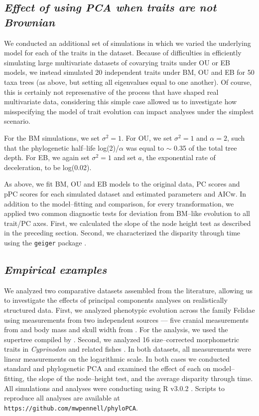 \documentclass[a4paper,11pt]{article}
\begin{document}
\subsection{\emph{Effect of using PCA when traits are not Brownian}}
We conducted an additional set of simulations in which we varied the underlying model for each of the traits in the dataset. Because of difficulties in efficiently simulating large multivariate datasets of covarying traits under OU or EB models, we instead simulated 20 independent traits under BM, OU and EB for 50 taxa trees (as above, but setting all eigenvalues equal to one another). Of course, this is certainly not represenative of the process that have shaped real multivariate data, considering this simple case allowed us to investigate how misspecifying the model of trait evolution can impact analyses under the simplest scenario.

For the BM simulations, we set $\sigma^2=\text{1}$. For OU, we set $\sigma^2=\text{1}$ and $\alpha=\text{2}$, such that the phylogenetic half--life log(2)/$\alpha$ \citep{Hansen2008} was equal to $\sim$ 0.35 of the total tree depth. For EB, we again set $\sigma^2=\text{1}$ and set $a$, the exponential rate of deceleration, to be log(0.02). 

As above, we fit BM, OU and EB models to the original data, PC scores and pPC scores for each simulated dataset and estimated parameters and AICw. In addition to the model--fitting and comparison, for every transformation, we applied two common diagnostic tests for deviation from BM--like evolution to all trait/PC axes. First, we calculated the slope of the node height test as described in the preceding section. Second, we characterized the disparity through time \citep{Harmon2003} using the \texttt{geiger} package \citep{geiger2}. 


\subsection{\emph{Empirical examples}}
We analyzed two comparative datasets assembled from the literature, allowing us to investigate the effects of principal components analyses on realistically structured data. First, we analyzed phenotypic evolution across the family Felidae using measurements from two independent sources --- five cranial measurements from \cite{slater_2009} and body mass and skull width from \cite{sakamoto_2010}. For the analysis, we used the supertree compiled by \cite{Nyakatura_2012}. Second, we analyzed 16 size--corrected morphometric traits in \textit{Cyprinodon} and related fishes \citep{Martin2011}. In both datasets, all measurements were linear measurements on the logarithmic scale. In both cases we conducted standard and phylogenetic PCA and examined the effect of each on model--fitting, the slope of the node--height test, and the average disparity through time. All simulations and analyses were conducting using R v3.0.2 \citep{R}. Scripts to reproduce all analyses are available at \texttt{https://github.com/mwpennell/phyloPCA}.
  
\end{document}
